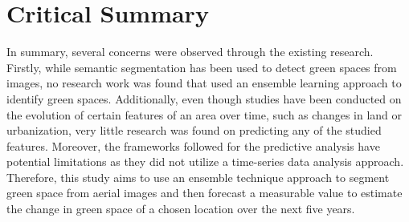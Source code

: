 \section{Critical Summary}
In summary, several concerns were observed through the existing research. Firstly, while semantic segmentation has been used to detect green spaces
from images, no research work was found that used an ensemble learning approach to identify green spaces. Additionally, even though studies have been conducted on the evolution of certain features of an area over time, such as changes in land or urbanization, very little research was found on predicting any of the studied features. Moreover, the frameworks followed for the predictive analysis have potential limitations as they did not utilize a time-series data analysis approach. Therefore, this study aims to use an ensemble technique approach to segment green space from aerial images and then forecast a measurable value to estimate the change in green space of a chosen location over the next five years.
%
%



\endinput

